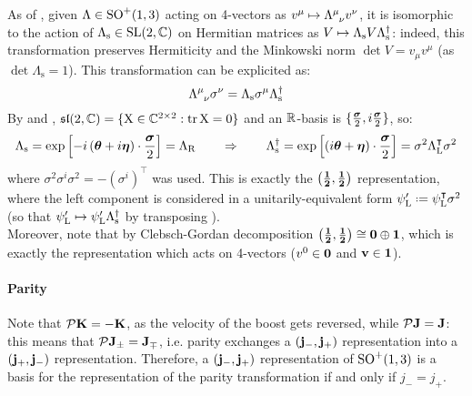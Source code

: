 As of , given $ \Lambda \in \mathrm{SO}^+(1,3) $ acting on 4-vectors as $ v^\mu \mapsto \tensor{\Lambda}{^\mu _\nu} v^\nu $, it is isomorphic to the action of $ \Lambda_\text{s} \in \mathrm{SL}(2,\mathbb{C}) $ on Hermitian matrices as $ V \mapsto \Lambda_\text{s} V \mathrm{\Lambda}_\text{s}^\dagger $: indeed, this transformation preserves Hermiticity and the Minkowski norm $ \det V = v_\mu v^\mu $ (as $ \det \Lambda_\text{s} = 1 $). This transformation can be explicited as:
\begin{equation}
  \tensor{\Lambda}{^\mu_\nu} \sigma^\nu = \Lambda_\text{s} \sigma^\mu \Lambda_\text{s}\dg
\end{equation}
By  and , $ \mathfrak{sl}(2,\mathbb{C}) = \{\mathrm{X} \in \mathbb{C}^{2 \times 2} : \operatorname{tr} \mathrm{X} = 0\} $ and an $ \mathbb{R} $-basis is $ \{\frac{\boldsymbol{\sigma}}{2},i\frac{\boldsymbol{\sigma}}{2}\} $, so:
\begin{equation*}
  \Lambda_\text{s} = \exp \left[ -i \left( \boldsymbol{\theta} + i \boldsymbol{\eta} \right) \cdot \frac{\boldsymbol{\sigma}}{2} \right] = \Lambda_\text{R}
  \qquad
  \Rightarrow
  \qquad
  \Lambda_\text{s}^\dagger = \exp \left[ \left( i \boldsymbol{\theta} + \boldsymbol{\eta} \right) \cdot \frac{\boldsymbol{\sigma}}{2} \right] = \sigma^2 \Lambda_\text{L}^\intercal \sigma^2
\end{equation*}
where $ \sigma^2 \sigma^i \sigma^2 = - (\sigma^i)^\intercal $ was used. This is exactly the $ \mathbf{\left( \frac{1}{2},\frac{1}{2} \right)} $ representation, where the left component is considered in a unitarily-equivalent form $ \psi_\text{L}' \defeq \psi_\text{L}^\intercal \sigma^2 $ (so that $ \psi_\text{L}' \mapsto \psi_\text{L}' \Lambda_\text{s}^\dagger $ by transposing ).\\
Moreover, note that by Clebsch-Gordan decomposition $ \mathbf{\left( \frac{1}{2},\frac{1}{2} \right)} \cong \mathbf{0} \oplus \mathbf{1} $, which is exactly the representation which acts on 4-vectors ($ v^0 \in \mathbf{0} $ and $ \mathbf{v} \in \mathbf{1} $).

\paragraph{Parity}

Note that $ \mathcal{P} \mathbf{K} = -\mathbf{K} $, as the velocity of the boost gets reversed, while $ \mathcal{P} \mathbf{J} = \mathbf{J} $: this means that $ \mathcal{P} \mathbf{J}_\pm = \mathbf{J}_\mp $, i.e. parity exchanges a $ \mathbf{\left( j_-,j_+ \right)} $ representation into a $ \mathbf{\left( j_+,j_- \right)} $ representation. Therefore, a $ \mathbf{\left( j_-,j_+ \right)} $ representation of $ \mathrm{SO}^+(1,3) $ is a basis for the representation of the parity transformation if and only if $ j_- = j_+ $.

